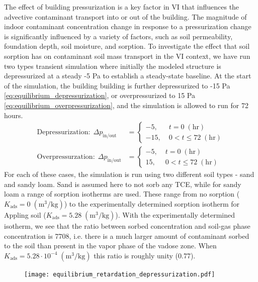 The effect of building pressurization is a key factor in VI that influences the advective contaminant transport into or out of the building.
The magnitude of indoor contaminant concentration change in response to a pressurization change is significantly influenced by a variety of factors, such as soil permeability, foundation depth, soil moisture, and sorption.
To investigate the effect that soil sorption has on contaminant soil mass transport in the VI context, we have run two types transient simulation where initially the modeled structure is depressurized at a steady -5 Pa to establish a steady-state baseline.
At the start of the simulation, the building building is further depressurized to -15 Pa \eqref{eq:equilibrium_depressurization}, or overpressurized to 15 Pa \eqref{eq:equilibrium_overpressurization}, and the simulation is allowed to run for 72 hours. %
\begin{align}
  \text{Depressurization}: \; \Delta p_\mathrm{in/out} &= \begin{cases}
    -5, \; &t = 0 \; \mathrm{(hr)} \\
    -15, \; &0 < t \leq 72 \; \mathrm{(hr)}
\end{cases}\label{eq:equilibrium_depressurization}\\
\text{Overpressurzation}: \; \Delta p_\mathrm{in/out} &= \begin{cases}
  -5, \; &t = 0 \; \mathrm{(hr)} \\
  15, \; &0 < t \leq 72 \; \mathrm{(hr)}
\end{cases}\label{eq:equilibrium_overpressurization}
\end{align}
For each of these cases, the simulation is run using two different soil types - sand and sandy loam.
Sand is assumed here to not sorb any TCE, while for sandy loam a range of sorption isotherms are used.
These range from no sorption ($K_\mathrm{ads} = 0 \; \mathrm{(m^3/kg)}$) to the experimentally determined sorption isotherm for Appling soil ($K_\mathrm{ads} = 5.28 \; \mathrm{(m^3/kg)}$).
With the experimentally determined isotherm, we see that the ratio between sorbed concentration and soil-gas phase concentration is 7708, i.e. there is a much larger amount of contaminant sorbed to the soil than present in the vapor phase of the vadose zone.
When $K_\mathrm{ads} = 5.28 \cdot 10^{-4} \; \mathrm{(m^3/kg)}$ this ratio is roughly unity (0.77).\par

\begin{figure}[!htb]
  \texttt{[image: equilibrium\_retardation\_depressurization.pdf]}
  \caption{}
  \label{fig:equilibrium_depressurization}
\end{figure}

